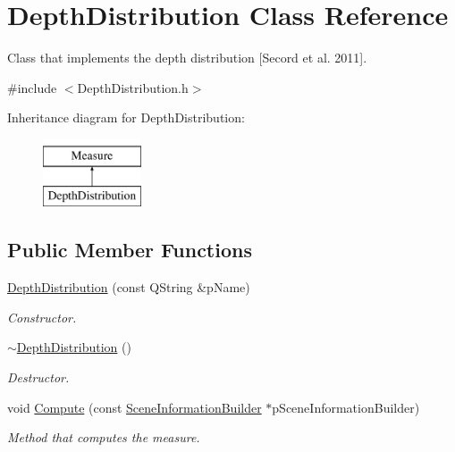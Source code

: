 \hypertarget{class_depth_distribution}{\section{Depth\+Distribution Class Reference}
\label{class_depth_distribution}
}


Class that implements the depth distribution \mbox{[}Secord et al. 2011\mbox{]}.  




{\ttfamily \#include $<$Depth\+Distribution.\+h$>$}

Inheritance diagram for Depth\+Distribution\+:\begin{figure}[H]
\begin{center}
\leavevmode
\includegraphics[height=2.000000cm]{class_depth_distribution}
\end{center}
\end{figure}
\subsection*{Public Member Functions}
\begin{DoxyCompactItemize}
\item 
\hyperlink{class_depth_distribution_a84d1d62eaad4b959aa61a3202e880d45}{Depth\+Distribution} (const Q\+String \&p\+Name)
\begin{DoxyCompactList}\small\item\em Constructor. \end{DoxyCompactList}\item 
\hyperlink{class_depth_distribution_a9f0042416af38e18a6fe0e7ab828103e}{$\sim$\+Depth\+Distribution} ()
\begin{DoxyCompactList}\small\item\em Destructor. \end{DoxyCompactList}\item 
void \hyperlink{class_depth_distribution_a2ae6d36e74346f0c6140d5e62f8b2e21}{Compute} (const \hyperlink{class_scene_information_builder}{Scene\+Information\+Builder} $\ast$p\+Scene\+Information\+Builder)
\begin{DoxyCompactList}\small\item\em Method that computes the measure. \end{DoxyCompactList}\end{DoxyCompactItemize}
